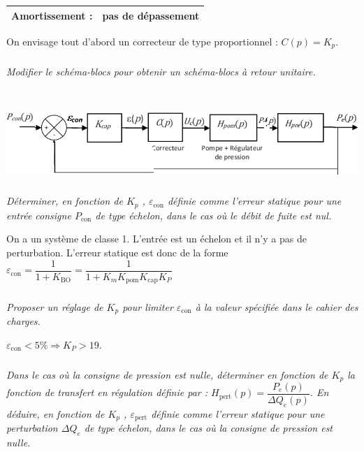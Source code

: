 \documentclass[10pt,fleqn]{article} %
\begin{document}
\begin{multicols}{2}
\begin{center}
\begin{tabular}{|l|p{5cm}|}
Amortissement :&	pas de dépassement \\ \hline
\end{tabular}
\end{center}


On envisage tout d’abord un correcteur de type proportionnel : $C(p)=K_p$. 

\fi

\subparagraph{}
\textit{Modifier le schéma-blocs pour obtenir un schéma-blocs à retour unitaire.}
\ifprof
\begin{corrige}~\\

\begin{center}
\includegraphics[width=\linewidth]{images_02/cor_02}
\end{center}

\end{corrige}
\else
\fi
\subparagraph{}
\textit{Déterminer, en fonction de $K_p$ , $\varepsilon_{\text{con}}$ définie comme l’erreur statique pour une entrée consigne $P_{\text{con}}$ de type échelon, dans le cas où le débit de fuite est nul.}
\ifprof
\begin{corrige}
On a un système de classe 1. L'entrée est un échelon et il n'y a pas de perturbation. L'erreur statique est donc de la forme
 $\varepsilon_{\text{con}} = \dfrac{1}{1+K_{\text{BO}}} = \dfrac{1}{1+K_m K_{\text{pom}}K_{\text{cap}}K_P}$
\end{corrige}
\else
\fi
\subparagraph{}
\textit{Proposer un réglage de $K_p$ pour limiter $\varepsilon_{\text{con}}$ à la valeur spécifiée dans le  cahier des charges.}
\ifprof
\begin{corrige}
 $\varepsilon_{\text{con}} <5\% \Rightarrow K_P > 19$. 
\end{corrige}
\else
\fi
\subparagraph{}
\textit{Dans le cas où la consigne de pression est nulle,  déterminer en fonction de $K_p$ la fonction de transfert en régulation définie par :
$H_{\text{pert}} (p)=\dfrac{P_e (p)}{\Delta Q_e (p)}$.
En déduire, en fonction de $K_p$ , $\varepsilon_{\text{pert}}$ définie comme l’erreur statique pour une perturbation $\Delta Q_e$ de type échelon, dans le cas où la consigne de pression est nulle.}


\end{multicols}
\end{document}
